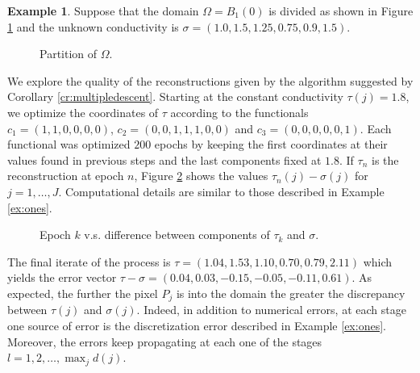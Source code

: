 \documentclass{article}
\theoremstyle{definition}
\newtheorem{example}[theorem]{Example}
\theoremstyle{remark}
\begin{document}
\begin{example}
Suppose that the domain $\Omega = B_1(0)$ is divided as shown in Figure \ref{fig:partition3} and the unknown conductivity is $\sigma = (1.0,1.5,1.25,0.75,0.9,1.5)$.
\begin{figure}[H]
\centering
{}
\caption{Partition of $\Omega$.}
\label{fig:partition3}
\end{figure}
We explore the quality of the reconstructions given by the algorithm suggested by Corollary \ref{cr:multipledescent}.
Starting at the constant conductivity $\tau(j)=1.8$, we optimize the coordinates of $\tau$ according to the functionals $c_1 = (1,1,0,0,0,0)$, $c_2 = (0,0,1,1,1,0,0)$ and $c_3 = (0,0,0,0,0,1)$.
Each functional was optimized $200$ epochs by keeping the first coordinates at their values found in previous steps and the last components fixed at $1.8$.
If $\tau_n$ is the reconstruction at epoch $n$, Figure \ref{fig:coordinatedescent} shows the values $\tau_n(j)-\sigma(j)$ for $j = 1,\dots,J$.
Computational details are similar to those described in Example \ref{ex:ones}.
\begin{figure}[H]
\centering

\caption{Epoch $k$ v.s. difference between components of $\tau_k$ and $\sigma$.}
\label{fig:coordinatedescent}
\end{figure}
The final iterate of the process is $\tau = (1.04, 1.53, 1.10, 0.70, 0.79, 2.11)$ which yields the error vector $\tau - \sigma = (0.04,0.03,-0.15,-0.05,-0.11,0.61)$.
As expected, the further the pixel $P_j$ is into the domain the greater the discrepancy between $\tau(j)$ and $\sigma(j)$.
Indeed, in addition to numerical errors, at each stage one source of error is the discretization error described in Example \ref{ex:ones}.
Moreover, the errors keep propagating at each one of the stages $l = 1,2,\dots,\max_j d(j)$.
\end{example}
\end{document}

